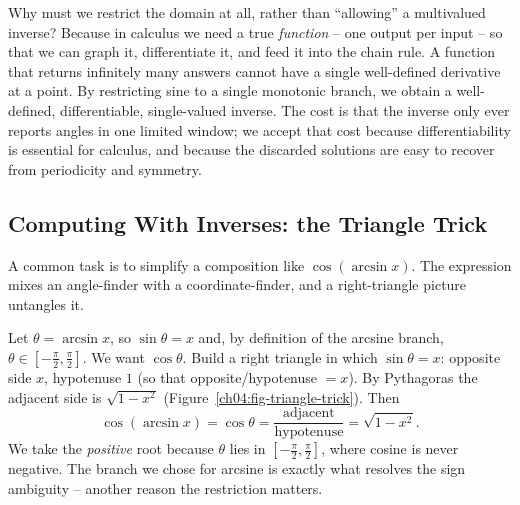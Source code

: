\begin{whybox}
Why must we restrict the domain at all, rather than ``allowing'' a multivalued inverse? Because in calculus we need a true \emph{function} -- one output per input -- so that we can graph it, differentiate it, and feed it into the chain rule. A function that returns infinitely many answers cannot have a single well-defined derivative at a point. By restricting sine to a single monotonic branch, we obtain a well-defined, differentiable, single-valued inverse. The cost is that the inverse only ever reports angles in one limited window; we accept that cost because differentiability is essential for calculus, and because the discarded solutions are easy to recover from periodicity and symmetry.
\end{whybox}

\subsection{Computing With Inverses: the Triangle Trick}

A common task is to simplify a composition like $\cos(\arcsin x)$. The expression mixes an angle-finder with a coordinate-finder, and a right-triangle picture untangles it.

\begin{example}
\label{ch04:ex-triangle}
Let $\theta = \arcsin x$, so $\sin\theta = x$ and, by definition of the arcsine branch, $\theta\in[-\tfrac\pi2,\tfrac\pi2]$. We want $\cos\theta$. Build a right triangle in which $\sin\theta = x$: opposite side $x$, hypotenuse $1$ (so that opposite/hypotenuse $= x$). By Pythagoras the adjacent side is $\sqrt{1 - x^2}$ (Figure~\ref{ch04:fig-triangle-trick}). Then
\[
  \cos(\arcsin x) = \cos\theta = \frac{\text{adjacent}}{\text{hypotenuse}} = \sqrt{1 - x^2}.
\]
We take the \emph{positive} root because $\theta$ lies in $[-\tfrac\pi2,\tfrac\pi2]$, where cosine is never negative. The branch we chose for arcsine is exactly what resolves the sign ambiguity -- another reason the restriction matters.
\end{example}

